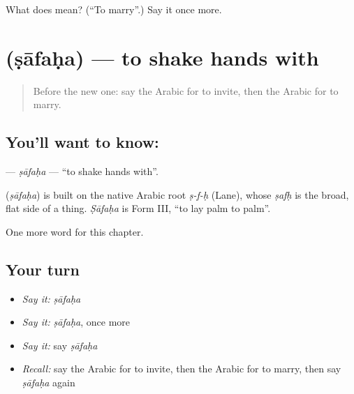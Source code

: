 \begin{tcolorbox}[breakable,colback=teal!4,colframe=teal!35!black,title={Before you move on}]
What does  mean? (\textquotedblleft{}To marry\textquotedblright{}.) Say it once more.
\end{tcolorbox}
\section[\texorpdfstring{\ar{صافح} (ṣāfaḥa)}{صافح (ṣāfaḥa)}]{ (ṣāfaḥa) — to shake hands with}

\label{lesson:AR-C163-safaha}



\begin{quote}
Before the new one: say the Arabic for to invite, then the Arabic for to marry.
\end{quote}

\subsection*{You'll want to know: }
\textbf{} — \emph{ṣāfaḥa} — \textquotedblleft{}to shake hands with\textquotedblright{}.

\begin{cousinweb}
\textbf{} (\emph{ṣāfaḥa}) is built on the native Arabic root \emph{ṣ-f-ḥ} (Lane), whose \emph{ṣafḥ} is the broad, flat side of a thing. \emph{Ṣāfaḥa} is Form III, \textquotedblleft{}to lay palm to palm\textquotedblright{}.
\end{cousinweb}

\begin{grammarlens}[title={What you've built}]
One more word for this chapter.
\end{grammarlens}

\subsection*{Your turn}
\begin{itemize}
\raggedright
  \item \emph{Say it:} \emph{ṣāfaḥa}
  \item \emph{Say it:} \emph{ṣāfaḥa}, once more
  \item \emph{Say it:} say \emph{ṣāfaḥa}
  \item \emph{Recall:} say the Arabic for to invite, then the Arabic for to marry, then say \emph{ṣāfaḥa} again
\end{itemize}

